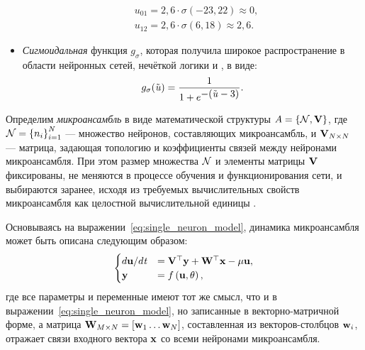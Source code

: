 \begin{itemize}
\begin{align*}
            &u_{01} = 2,6 \cdot \sigma\left(-23,22\right) \approx 0, \\
            &u_{12} = 2,6 \cdot \sigma\left(6,18\right) \approx 2,6.
        \end{align*}
	\item \textit{Сигмоидальная} функция $g_{\sigma}$, которая получила широкое распространение в области нейронных сетей, нечёткой логики и \other, в виде:
		\begin{equation}
            \label{eq:activation_function_sigma}
			g_{\sigma}(\tilde{\mathit{u}}) = \dfrac{1}{1 + e^{\displaystyle -(\tilde{\mathit{u}} - 3)}}.
		\end{equation}
\end{itemize}


\begin{Definition*}
    Определим \textit{микроансамбль} в виде математической структуры $A = \left\{ \mathcal{N}, \mathrm{\mathbf{V}} \right\}$, где $\mathcal{N} = \left\{ n_{i} \right\}_{i=1}^{N} $ --- множество нейронов, составляющих микроансамбль, и $\mathrm{\mathbf{V}}_{N \times N}$ --- матрица, задающая топологию и коэффициенты связей между нейронами микроансамбля. При этом размер множества $\mathcal{N}$ и элементы матрицы $\mathrm{\mathbf{V}}$ фиксированы, \ie не меняются в процессе обучения и функционирования сети, и выбираются заранее, исходя из требуемых вычислительных свойств микроансамбля как целостной вычислительной единицы .
\end{Definition*}

Основываясь на выражении~\eqref{eq:single_neuron_model}, динамика микроансамбля может быть описана следующим образом:
\begin{equation}
    \label{eq:microensemble_model}
    \begin{cases}
        d\mathrm{\mathbf{u}}/d\mathit{t} &= \mathrm{\mathbf{V}}^{\top} \mathrm{\mathbf{y}} + \mathrm{\mathbf{W}}^{\top} \mathrm{\mathbf{x}} - \mu \mathrm{\mathbf{u}}, \\
        \mathrm{\mathbf{y}}              &= f\left( \mathrm{\mathbf{u}}, \theta \right), \\
    \end{cases}
\end{equation}
где все параметры и переменные имеют тот же смысл, что и в выражении~\eqref{eq:single_neuron_model}, но записанные в векторно-матричной форме, а матрица $\mathrm{\mathbf{W}}_{M \times N} = \left[ \mathrm{\mathbf{w}}_{1} \ldots \mathrm{\mathbf{w}}_{N} \right]$, составленная из векторов-столбцов $\mathrm{\mathbf{w}}_{i}$, отражает связи входного вектора $\mathrm{\mathbf{x}}$ со всеми нейронами микроансамбля.

